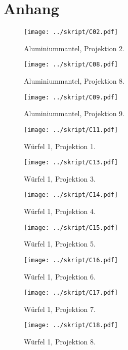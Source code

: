 \section{Anhang}
\begin{figure}[htbp]
	\begin{minipage}{0.5\textwidth} 
	\texttt{[image: ../skript/C02.pdf]}
	\caption{Aluminiummantel, Projektion 2.}
	\end{minipage}
	\hfill
	\begin{minipage}{0.5\textwidth}
	\texttt{[image: ../skript/C08.pdf]}
	\caption{Aluminiummantel, Projektion 8.}
	\end{minipage}
\end{figure}

\begin{figure}[htbp]
	\begin{minipage}{0.5\textwidth} 
	\texttt{[image: ../skript/C09.pdf]}
	\caption{Aluminiummantel, Projektion 9.}
	\end{minipage}
	\hfill
	\begin{minipage}{0.5\textwidth}
	\texttt{[image: ../skript/C11.pdf]}
	\caption{Würfel 1, Projektion 1.}
	\end{minipage}
\end{figure}

\begin{figure}[htbp]
	\begin{minipage}{0.5\textwidth} 
	\texttt{[image: ../skript/C13.pdf]}
	\caption{Würfel 1, Projektion 3.}
	\end{minipage}
	\hfill
	\begin{minipage}{0.5\textwidth}
	\texttt{[image: ../skript/C14.pdf]}
	\caption{Würfel 1, Projektion 4.}
	\end{minipage}
\end{figure}

\begin{figure}[htbp]
	\begin{minipage}{0.5\textwidth} 
	\texttt{[image: ../skript/C15.pdf]}
	\caption{Würfel 1, Projektion 5.}
	\end{minipage}
	\hfill
	\begin{minipage}{0.5\textwidth}
	\texttt{[image: ../skript/C16.pdf]}
	\caption{Würfel 1, Projektion 6.}
	\end{minipage}
\end{figure}

\begin{figure}[htbp]
	\begin{minipage}{0.5\textwidth} 
	\texttt{[image: ../skript/C17.pdf]}
	\caption{Würfel 1, Projektion 7.}
	\end{minipage}
	\hfill
	\begin{minipage}{0.5\textwidth}
	\texttt{[image: ../skript/C18.pdf]}
	\caption{Würfel 1, Projektion 8.}
	\end{minipage}
\end{figure}

